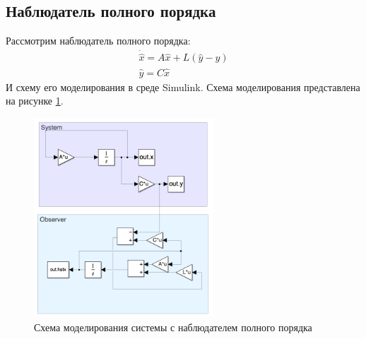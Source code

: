 \subsection{Наблюдатель полного порядка}
Рассмотрим наблюдатель полного порядка:
\begin{equation}
    \begin{array}{ll}
        \dot{\hat{x}} = A\hat{x} + L(\hat{y} - y) \\
        \hat{y} = C\hat{x}
    \end{array}
\end{equation}
И схему его моделирования в среде Simulink. Схема моделирования представлена на рисунке \ref{fig:scheme2}.
\begin{figure}[ht!]
    \centering
    \includegraphics[width=0.6\textwidth]{media/scheme2.png}
    \caption{Схема моделирования системы с наблюдателем полного порядка}
    \label{fig:scheme2}
\end{figure}

